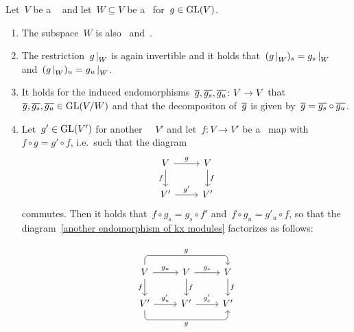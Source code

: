 \begin{lemma}
  \label{properties of mjcd}
  Let~$V$ be a ~ and let~$W \subseteq V$ be a~ for~$g \in \operatorname{GL}(V)$.
  \begin{enumerate}
    \item
      The subspace~$W$ is also~ and~.
    \item
      \label{restriction of mjcd}
      The restriction~$\restrict{g}{W}$ is again invertible and it holds that~$(\restrict{g}{W})_s = \restrict{g_s}{W}$ and~$(\restrict{g}{W})_u = \restrict{g_u}{W}$.
    \item
      \label{induced mjcd}
      It holds for the induced endomorphisms~$\overline{g}, \overline{g_s}, \overline{g_u} \colon V \to V$ that~$\overline{g}, \overline{g_s}, \overline{g_u} \in \operatorname{GL}(V/W)$ and that the {\JCD} decompositon of~$\overline{g}$ is given by~$\overline{g} = \overline{g_s} \circ \overline{g_u}$.
    \item
      Let~$g' \in \operatorname{GL}(V')$ for another ~~$V'$ and let~$f \colon V \to V'$ be a~ map with~$f \circ g = g' \circ f$, i.e.\ such that the diagram
      \begin{equation}
        \label{another endomorphism of kx modules}
        \begin{tikzcd}
            V
            \arrow{r}[above]{g}
            \arrow{d}[left]{f}
          & V
            \arrow{d}[right]{f}
          \\
            V'
            \arrow{r}[above]{g'}
          & V'
        \end{tikzcd}
      \end{equation}
      commutes.
      Then it holds that~$f \circ g_s = g_s \circ f'$ and~$f \circ g_u = g'_u \circ f$, so that the diagram~\eqref{another endomorphism of kx modules} factorizes as follows:
      \[
        \begin{tikzcd}
            {}
          & {}
          & {}
          \\
            V
            \arrow[rounded corners,
              to path = { -- ([yshift=1em] \tikztostart.north)
                          -- ([yshift=1em] \tikztotarget.north) \tikztonodes
                          -- (\tikztotarget)
                        }
            ]{rr}[above]{g}
            \arrow{r}[above]{g_u}
            \arrow{d}[left]{f}
          & V
            \arrow{r}[above]{g_s}
            \arrow{d}[right]{f}
          & V
            \arrow{d}[right]{f}
          \\
            V'
            \arrow{r}[above]{g'_u}
            \arrow[rounded corners,
              to path = { -- ([yshift=-1em] \tikztostart.south)
                          -- ([yshift=-1em] \tikztotarget.south) \tikztonodes
                          -- (\tikztotarget)
                        }
            ]{rr}[below]{g}
          & V'
            \arrow{r}[above]{g'_s}
          & V'
        \end{tikzcd}
      \]
  \end{enumerate}
\end{lemma}


